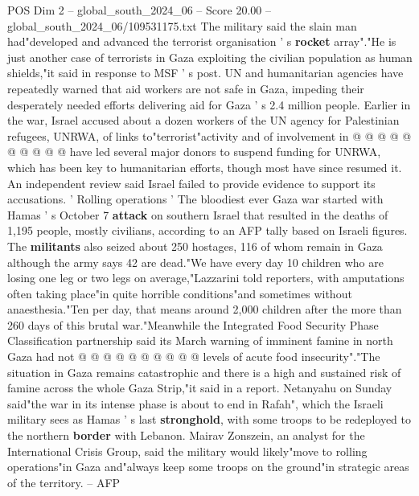 \begin{textsample}{POS Dim 2 – global\_south\_2024\_06 – Score 20.00 – global\_south\_2024\_06/109531175.txt}
The military said the slain man had"developed and advanced the terrorist organisation ' s \textbf{rocket} array"."He is just another case of terrorists in Gaza exploiting the civilian population as human shields,"it said in response to MSF ' s post.
UN and humanitarian agencies have repeatedly warned that aid workers are not safe in Gaza, impeding their desperately needed efforts delivering aid for Gaza ' s 2.4 million people.
Earlier in the war, Israel accused about a dozen workers of the UN agency for Palestinian refugees, UNRWA, of links to"terrorist"activity and of involvement in @ @ @ @ @ @ @ @ @ @ have led several major donors to suspend funding for UNRWA, which has been key to humanitarian efforts, though most have since resumed it.
An independent review said Israel failed to provide evidence to support its accusations. ' Rolling operations ' The bloodiest ever Gaza war started with Hamas ' s October 7 \textbf{attack} on southern Israel that resulted in the deaths of 1,195 people, mostly civilians, according to an AFP tally based on Israeli figures.
The \textbf{militants} also seized about 250 hostages, 116 of whom remain in Gaza although the army says 42 are dead."We have every day 10 children who are losing one leg or two legs on average,"Lazzarini told reporters, with amputations often taking place"in quite horrible conditions"and sometimes without anaesthesia."Ten per day, that means around 2,000 children after the more than 260 days of this brutal war."Meanwhile the Integrated Food Security Phase Classification partnership said its March warning of imminent famine in north Gaza had not @ @ @ @ @ @ @ @ @ @ levels of acute food insecurity"."The situation in Gaza remains catastrophic and there is a high and sustained risk of famine across the whole Gaza Strip,"it said in a report.
Netanyahu on Sunday said"the war in its intense phase is about to end in Rafah", which the Israeli military sees as Hamas ' s last \textbf{stronghold}, with some troops to be redeployed to the northern \textbf{border} with Lebanon.
Mairav Zonszein, an analyst for the International Crisis Group, said the military would likely"move to rolling operations"in Gaza and"always keep some troops on the ground"in strategic areas of the territory. -- AFP

\end{textsample}
